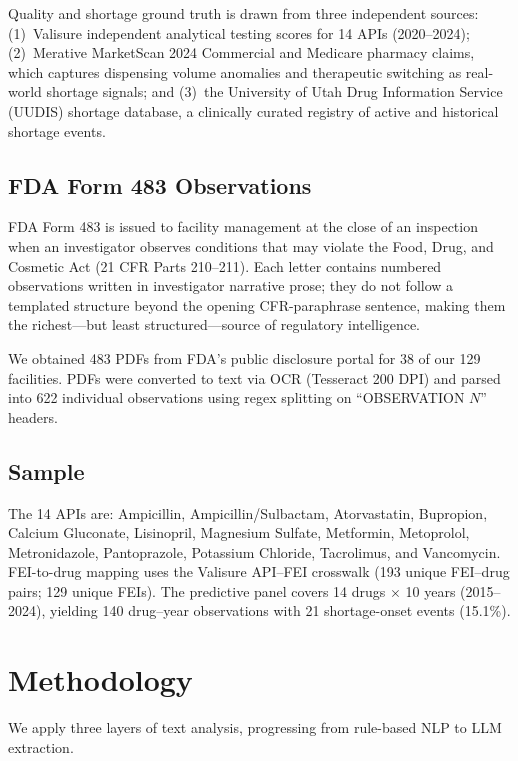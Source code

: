 \documentclass[12pt]{article}
\begin{document}
Quality and shortage ground truth is drawn from three independent sources:
(1)~Valisure independent analytical testing scores for 14 APIs (2020--2024);
(2)~Merative MarketScan 2024 Commercial and Medicare pharmacy claims, which
captures dispensing volume anomalies and therapeutic switching as real-world
shortage signals; and
(3)~the University of Utah Drug Information Service (UUDIS) shortage database,
a clinically curated registry of active and historical shortage events.

\subsection{FDA Form 483 Observations}

FDA Form 483 is issued to facility management at the close of an inspection
when an investigator observes conditions that may violate the Food, Drug, and
Cosmetic Act (21 CFR Parts 210--211).
Each letter contains numbered observations written in investigator narrative
prose; they do not follow a templated structure beyond the opening
CFR-paraphrase sentence, making them the richest---but least structured---source
of regulatory intelligence.

We obtained 483 PDFs from FDA's public disclosure portal for 38 of our 129
facilities.
PDFs were converted to text via OCR (Tesseract 200 DPI) and parsed into
622 individual observations using regex splitting on ``OBSERVATION $N$'' headers.

\subsection{Sample}

The 14 APIs are: Ampicillin, Ampicillin/Sulbactam, Atorvastatin, Bupropion,
Calcium Gluconate, Lisinopril, Magnesium Sulfate, Metformin, Metoprolol,
Metronidazole, Pantoprazole, Potassium Chloride, Tacrolimus, and Vancomycin.
FEI-to-drug mapping uses the Valisure API--FEI crosswalk (193 unique FEI--drug
pairs; 129 unique FEIs).
The predictive panel covers 14 drugs $\times$ 10 years (2015--2024),
yielding 140 drug--year observations with 21 shortage-onset events (15.1\%).

\section{Methodology}
\label{sec:methods}

We apply three layers of text analysis, progressing from rule-based NLP to
LLM extraction.
\end{document}
